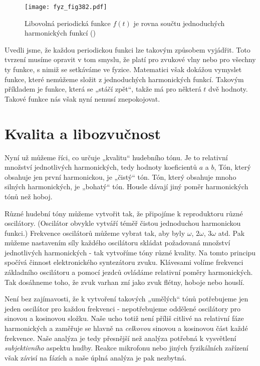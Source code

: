   \begin{figure}[ht!] %
    \centering
    \texttt{[image: fyz\_fig382.pdf]}
    \caption{Libovolná periodická funkce \(f(t)\) je rovna součtu jednoduchých harmonických funkcí
             (\cite[s.~675]{Feynman01})}
    \label{fyz:fig382}
  \end{figure}
  
  Uvedli jsme, že každou periodickou funkci lze takovým způsobem vyjádřit. Toto tvrzení musíme 
  opravit v tom smyslu, že platí pro zvukové vlny nebo pro všechny ty funkce, s nimiž se setkáváme 
  ve fyzice. Matematici však dokážou vymyslet funkce, které nemůžeme složit z jednoduchých 
  harmonických funkcí. Takovým příkladem je funkce, která se „stáčí zpět“, takže má pro některá 
  \(t\) dvě hodnoty. Takové funkce nás však nyní nemusí znepokojovat.
  
\section{Kvalita a libozvučnost}\label{fyz:IchapLsecIII}
  Nyní už můžeme říci, co určuje „kvalitu“ hudebního tónu. Je to relativní množství jednotlivých 
  harmonických, tedy hodnoty koeficientů \(a\) a \(b\), Tón, který obsahuje jen první harmonickou, 
  je „čistý“ tón. Tón, který obsahuje mnoho silných harmonických, je „bohatý“ tón. Housle dávají 
  jiný poměr harmonických tónů než hoboj.
  
  Různé hudební tóny můžeme vytvořit tak, že připojíme k reproduktoru různé oscilátory. (Oscilátor 
  obvykle vytváří téměř čistou jednoduchou harmonickou funkci.) Frekvence oscilátorů můžeme vybrat 
  tak, aby byly \(\omega\), \(2\omega\), \(3\omega\) atd. Pak můžeme nastavením síly každého 
  oscilátoru skládat požadovaná množství jednotlivých harmonických - tak vytvoříme tóny různé 
  kvality. Na tomto principu spočívá činnost elektronického syntezátoru zvuku. Klávesami volíme 
  frekvenci základního oscilátoru a pomocí jezdců ovládáme relativní poměry harmonických. Tak 
  dosáhneme toho, že zvuk varhan zní jako zvuk flétny, hoboje nebo houslí.
  
  Není bez zajímavosti, že k vytvoření takových „umělých“ tónů potřebujeme jen jeden oscilátor pro 
  každou frekvenci - nepotřebujeme oddělené oscilátory pro sinovou a kosinovou složku. Naše ucho 
  totiž není příliš citlivé na relativní fáze harmonických a zaměřuje se hlavně na \emph{celkovou} 
  sinovou a kosinovou část každé frekvence. Naše analýza je tedy přesnější než analýza potřebná 
  k vysvětlení \emph{subjektivního} aspektu hudby. Reakce mikrofonu nebo jiných fyzikálních 
  zařízení však závisí na fázích a naše úplná analýza je pak nezbytná. 
  
